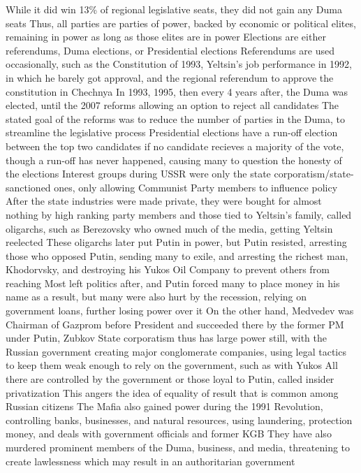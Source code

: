 \documentclass[11 pt, twoside]{article}
\newenvironment{outline*}
{
	\begin{outline}[enumerate]
	}
	{\end{outline}
}
\begin{document}
\begin{outline*}
\3 While it did win 13\% of regional legislative seats, they did not gain any Duma seats
\2 Thus, all parties are parties of power, backed by economic or political elites, remaining in power as long as those elites are in power
\1 Elections are either referendums, Duma elections, or Presidential elections
\2 Referendums are used occasionally, such as the Constitution of 1993, Yeltsin's job performance in 1992, in which he barely got approval, and the regional referendum to approve the constitution in Chechnya
\2 In 1993, 1995, then every 4 years after, the Duma was elected, until the 2007 reforms allowing an option to reject all candidates
\3 The stated goal of the reforms was to reduce the number of parties in the Duma, to streamline the legislative process
\2 Presidential elections have a run-off election between the top two candidates if no candidate recieves a majority of the vote, though a run-off has never happened, causing many to question the honesty of the elections
\1 Interest groups during USSR were only the state corporatism/state-sanctioned ones, only allowing Communist Party members to influence policy
\2 After the state industries were made private, they were bought for almost nothing by high ranking party members and those tied to Yeltsin's family, called oligarchs, such as Berezovsky who owned much of the media, getting Yeltsin reelected
\3 These oligarchs later put Putin in power, but Putin resisted, arresting those who opposed Putin, sending many to exile, and arresting the richest man, Khodorvsky, and destroying his Yukos Oil Company to prevent others from reaching
\3 Most left politics after, and Putin forced many to place money in his name as a result, but many were also hurt by the recession, relying on government loans, further losing power over it
\3 On the other hand, Medvedev was Chairman of Gazprom before President and succeeded there by the former PM under Putin, Zubkov
\2 State corporatism thus has large power still, with the Russian government creating major conglomerate companies, using legal tactics to keep them weak enough to rely on the government, such as with Yukos
\3 All there are controlled by the government or those loyal to Putin, called insider privatization
\3 This angers the idea of equality of result that is common among Russian citizens
\2 The Mafia also gained power during the 1991 Revolution, controlling banks, businesses, and natural resources, using laundering, protection money, and deals with government officials and former KGB
\3 They have also murdered prominent members of the Duma, business, and media, threatening to create lawlessness which may result in an authoritarian government

\end{outline*}
\end{document}
